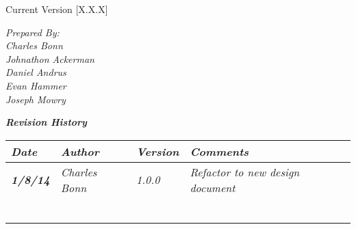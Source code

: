 


Current Version [X.X.X]
\vspace*{5mm}

{\color{SDColor5}
\noindent
\textit{Prepared By:}\\
\textit{Charles Bonn}\\
\textit{Johnathon Ackerman}\\
\textit{Daniel Andrus}\\
\textit{Evan Hammer}\\
\textit{Joseph Mowry}
}

\vfill
\noindent
{\color{SDColor3} \textit{\textbf{Revision History}}}\\
\begin{tabular}{|>{\raggedright}p{1.5cm}|>{\raggedright}p{3cm}|>{\raggedright}p{1.5cm}|>{\raggedright}p{9cm}|}
\hline
\textit{\textbf{Date}} &  \textit{\textbf{Author}} & \textit{\textbf{Version}} & \textit{\textbf{Comments}}\tabularnewline
\hline
 \textit{\textbf{1/8/14}} & \textit{Charles Bonn} & \textit{1.0.0} & \textit{Refactor to new design document}\tabularnewline
\hline
\textit{\textbf{}} & \textit{} & \textit{} & \textit{}\tabularnewline
\hline
 &  &  & \tabularnewline
 \hline
 &  &  & \tabularnewline
\hline
 &  &  & \tabularnewline
\hline
 &  &  & \tabularnewline
\hline
 &  &  & \tabularnewline
\hline
\end{tabular}
\vfill

